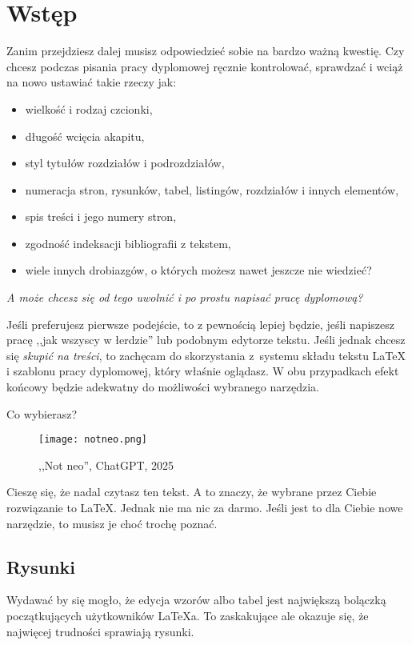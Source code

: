 \chapter{Wstęp}
\label{ch:wstep}

Zanim przejdziesz dalej musisz odpowiedzieć sobie na bardzo ważną kwestię. Czy chcesz podczas pisania pracy dyplomowej ręcznie kontrolować, sprawdzać i wciąż na nowo ustawiać takie rzeczy jak:

\begin{itemize}
	\item wielkość i rodzaj czcionki,
	\item długość wcięcia akapitu,
	\item styl tytułów rozdziałów i podrozdziałów,
	\item numeracja stron, rysunków, tabel, listingów, rozdziałów i innych elementów,
	\item spis treści i jego numery stron,
	\item zgodność indeksacji bibliografii z tekstem,
	\item wiele innych drobiazgów, o których możesz nawet jeszcze nie wiedzieć?
\end{itemize}

\textit{A może chcesz się od tego uwolnić i po prostu napisać pracę dyplomową?}

Jeśli preferujesz pierwsze podejście, to z pewnością lepiej będzie, jeśli napiszesz pracę ,,jak wszyscy w łerdzie'' lub podobnym edytorze tekstu. Jeśli jednak chcesz się \textit{skupić na treści}, to zachęcam do skorzystania z~systemu składu tekstu \LaTeX{} i szablonu pracy dyplomowej, który właśnie oglądasz. W obu przypadkach efekt końcowy będzie adekwatny do możliwości wybranego narzędzia.

Co wybierasz?

\begin{figure}[!htbp]
	\centering \texttt{[image: notneo.png]} %
	\caption{,,Not neo'', ChatGPT, 2025}
	\label{rys:notneo}
\end{figure}

Cieszę się, że nadal czytasz ten tekst. A to znaczy, że wybrane przez Ciebie rozwiązanie to \LaTeX. Jednak nie ma nic za darmo. Jeśli jest to dla Ciebie nowe narzędzie, to musisz je choć trochę poznać.

\section{Rysunki}
Wydawać by się mogło, że edycja wzorów albo tabel jest największą bolączką początkujących użytkowników \LaTeX{a}. To zaskakujące ale okazuje się, że najwięcej trudności sprawiają rysunki.

